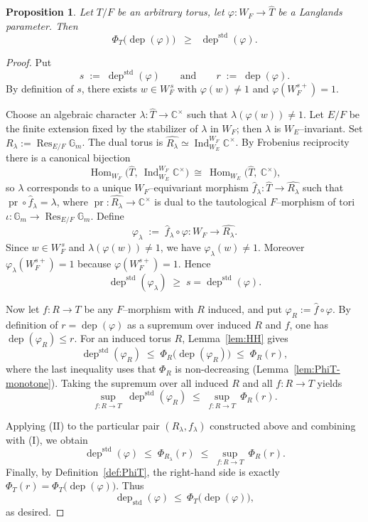 \documentclass[american]{article}
\numberwithin{equation}{section}
\numberwithin{figure}{section}
\theoremstyle{plain}
\newtheorem{proposition}[theorem]{Proposition}
\theoremstyle{definition}
\theoremstyle{remark}
\DeclareMathOperator{\Hom}{Hom}
\DeclareMathOperator{\dep}{dep}
\DeclareMathOperator{\Res}{Res}
\DeclareMathOperator{\Ind}{Ind}
\DeclareMathOperator{\std}{std}
\DeclareMathOperator{\pr}{pr}
\newcommand{\CC}{\mathbb{C}}
\newcommand{\Gm}{\mathbb{G}_m}
\begin{document}
\begin{proposition}\label{prop:Phi-bounds-std}
Let $T/F$ be an arbitrary torus, let
\(
\varphi:W_F\longrightarrow\widehat T
\)
be a Langlands parameter.    
Then
\[
   \Phi_T\!\bigl(\dep(\varphi)\bigr)\;\;\ge\;\;\dep^{\std}(\varphi).
\]
\end{proposition}
\begin{proof}
Put
\[
s \;:=\; \dep^{\std}(\varphi)
\qquad\text{and}\qquad
r \;:=\; \dep(\varphi).
\]
By definition of $s$, there exists $w\in W_F^{\,s}$ with $\varphi(w)\neq 1$ and
$\varphi(W_F^{s+})=1$.

Choose an algebraic character $\lambda:\widehat T\to\CC^\times$ such that
$\lambda(\varphi(w))\ne 1$.
Let $E/F$ be the finite extension fixed by the stabilizer of $\lambda$ in $W_F$; then
$\lambda$ is $W_E$--invariant.  Set $R_\lambda:=\Res_{E/F}\Gm$.
The dual torus is $\widehat{R_\lambda}\simeq \Ind_{W_E}^{W_F}\CC^\times$.
By Frobenius reciprocity there is a canonical bijection
\[
\Hom_{W_F}\!\bigl(\widehat T,\ \Ind_{W_E}^{W_F}\CC^\times\bigr)
\ \cong\
\Hom_{W_E}\!\bigl(\widehat T,\ \CC^\times\bigr),
\]
so $\lambda$ corresponds to a unique $W_F$--equivariant morphism
$\widehat f_\lambda:\widehat T\to \widehat{R_\lambda}$ such that
$\pr\circ \widehat f_\lambda=\lambda$, where $\pr:\widehat{R_\lambda}\to\CC^\times$
is dual to the tautological $F$--morphism of tori
$\iota:\Gm\to \Res_{E/F}\Gm$.
Define
\[
\varphi_\lambda \;:=\; \widehat f_\lambda\circ \varphi : W_F\to \widehat{R_\lambda}.
\]
Since $w\in W_F^{\,s}$ and $\lambda(\varphi(w))\neq 1$, we have $\varphi_\lambda(w)\neq 1$.
Moreover $\varphi_\lambda(W_F^{s+})=1$ because $\varphi(W_F^{s+})=1$.
Hence
\[
\dep^{\std}(\varphi_\lambda)\;\ge\; s=\dep^{\std}(\varphi). \tag{I}
\]

Now let $f:R\to T$ be any $F$--morphism with $R$ induced, and put
\(
\varphi_R:=\widehat f\circ \varphi.
\)
By definition of $r=\dep(\varphi)$ as a supremum over induced $R$ and $f$, one has
\(
\dep(\varphi_R)\le r.
\)
For an induced torus $R$, Lemma~\ref{lem:HH} gives
\[
\dep^{\std}(\varphi_R)
\;\le\;
\Phi_R\!\bigl(\dep(\varphi_R)\bigr)
\;\le\;
\Phi_R(r),
\]
where the last inequality uses that $\Phi_R$ is non-decreasing (Lemma~\ref{lem:PhiT-monotone}).
Taking the supremum over all induced $R$ and all $f:R\to T$ yields
\[
\sup_{f:R\to T}\ \dep^{\std}(\varphi_R)
\;\le\;
\sup_{f:R\to T}\ \Phi_R(r). \tag{II}
\]

Applying (II) to the particular pair $(R_\lambda,f_\lambda)$ constructed above and combining with (I),
we obtain
\[
\dep^{\std}(\varphi)
\;\le\;
\Phi_{R_\lambda}(r)
\;\le\;
\sup_{f:R\to T}\ \Phi_R(r).
\]
Finally, by Definition~\ref{def:PhiT}, the right-hand side
is exactly $\Phi_T(r)=\Phi_T\bigl(\dep(\varphi)\bigr)$. Thus
\[
\dep_{\std}(\varphi)\ \le\ \Phi_T\!\bigl(\dep(\varphi)\bigr),
\]
as desired.
\end{proof}
\end{document}
